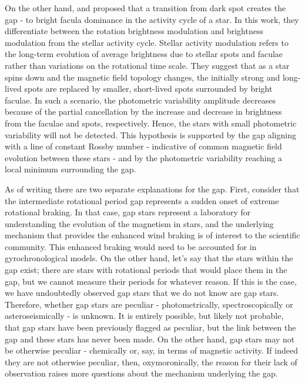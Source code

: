 On the other hand, \citet{reinhold_transition_2019} and \citet{reinhold_stellar_2020} proposed that a transition from dark spot creates the gap - to bright facula dominance in the activity cycle of a star.
In this work, they differentiate between the rotation brightness modulation and brightness modulation from the stellar activity cycle.
Stellar activity modulation refers to the long-term evolution of average brightness due to stellar spots and faculae rather than variations on the rotational time scale.
They suggest that as a star spins down and the magnetic field topology changes, the initially strong and long-lived spots are replaced by smaller, short-lived spots surrounded by bright faculae.
In such a scenario, the photometric variability amplitude decreases because of the partial cancellation by the increase and decrease in brightness from the faculae and spots, respectively.
Hence, the stars with small photometric variability will not be detected.
This hypothesis is supported by the gap aligning with a line of constant Rossby number - indicative of common magnetic field evolution between these stars - and by the photometric variability reaching a local minimum surrounding the gap.

As of writing there are two separate explanations for the gap.
First, consider that the intermediate rotational period gap represents a sudden onset of extreme rotational braking.
In that case, gap stars represent a laboratory for understanding the evolution of the magnetism in stars, and the underlying mechanism that provides the enhanced wind braking is of interest to the scientific community. 
This enhanced braking would need to be accounted for in gyrochronological models.
On the other hand, let's say that the stars within the gap exist; there are stars with rotational periods that would place them in the gap, but we cannot measure their periods for whatever reason.
If this is the case, we have undoubtedly observed gap stars that we do not know are gap stars.
Therefore, whether gap stars are peculiar - photometrically, spectroscopically or asteroseismically - is unknown.
It is entirely possible, but likely not probable, that gap stars have been previously flagged as peculiar, but the link between the gap and these stars has never been made.
On the other hand, gap stars may not be otherwise peculiar - chemically or, say, in terms of magnetic activity.
If indeed they are not otherwise peculiar, then, oxymoronically, the reason for their lack of observation raises more questions about the mechanism underlying the gap.

